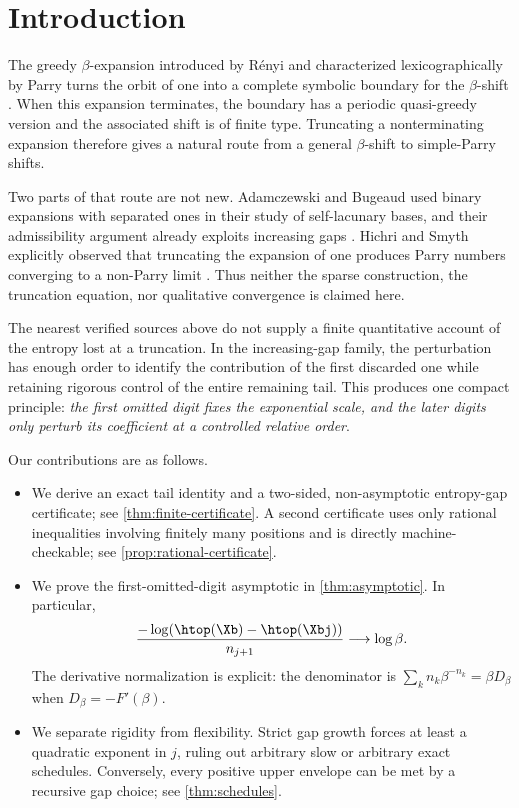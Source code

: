 \section{Introduction}

The greedy $\beta$-expansion introduced by R\'enyi and characterized lexicographically by Parry turns the orbit of one into a complete symbolic boundary for the $\beta$-shift \cite{renyi_1957,parry_1960}.  When this expansion terminates, the boundary has a periodic quasi-greedy version and the associated shift is of finite type.  Truncating a nonterminating expansion therefore gives a natural route from a general $\beta$-shift to simple-Parry shifts.

Two parts of that route are not new.  Adamczewski and Bugeaud used binary expansions with separated ones in their study of self-lacunary bases, and their admissibility argument already exploits increasing gaps \cite[Section~4]{adamczewski_bugeaud_2007}.  Hichri and Smyth explicitly observed that truncating the expansion of one produces Parry numbers converging to a non-Parry limit \cite[Example~4.4]{hichri_smyth_2024}.  Thus neither the sparse construction, the truncation equation, nor qualitative convergence is claimed here.

The nearest verified sources above do not supply a finite quantitative account of the entropy lost at a truncation.  In the increasing-gap family, the perturbation has enough order to identify the contribution of the first discarded one while retaining rigorous control of the entire remaining tail.  This produces one compact principle: \emph{the first omitted digit fixes the exponential scale, and the later digits only perturb its coefficient at a controlled relative order}.

Our contributions are as follows.
\begin{itemize}
    \item We derive an exact tail identity and a two-sided, non-asymptotic entropy-gap certificate; see \cref{thm:finite-certificate}.  A second certificate uses only rational inequalities involving finitely many positions and is directly machine-checkable; see \cref{prop:rational-certificate}.
    \item We prove the first-omitted-digit asymptotic in \cref{thm:asymptotic}.  In particular,
    \[
    \frac{-\log(\htop(\Xb)-\htop(\Xbj))}{n_{j+1}}\longrightarrow\log\beta.
    \]
    The derivative normalization is explicit: the denominator is $\sum_k n_k\beta^{-n_k}=\beta D_\beta$ when $D_\beta=-F'(\beta)$.
    \item We separate rigidity from flexibility.  Strict gap growth forces at least a quadratic exponent in $j$, ruling out arbitrary slow or arbitrary exact schedules.  Conversely, every positive upper envelope can be met by a recursive gap choice; see \cref{thm:schedules}.
\end{itemize}

